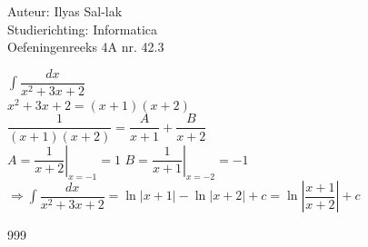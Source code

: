 \documentclass[a4paper]{article}
\newcommand{\dint}{\displaystyle\int}
\begin{document}
\noindent \large Auteur: Ilyas Sal-lak \\
\noindent \large Studierichting: Informatica\\
\noindent \large Oefeningenreeks 4A nr. 42.3\\
\medskip
\normalsize

$\dint \dfrac{dx}{x^2 + 3x + 2}$ \\

$x^2 + 3x + 2 = (x+1)(x+2)$ \\

$\dfrac{1}{(x+1)(x+2)} = \dfrac{A}{x+1} + \dfrac{B}{x+2}$ \\

$A = \left.\dfrac{1}{x+2}\right|_{x=-1} = 1$ \quad $B = \left.\dfrac{1}{x+1}\right|_{x=-2} = -1$ \\

$\Rightarrow \dint \dfrac{dx}{x^2+3x+2} = \ln|x+1| - \ln|x+2| + c = \ln\left|\dfrac{x+1}{x+2}\right| + c$

\begin{thebibliography}{999}
\end{thebibliography}
\end{document}
